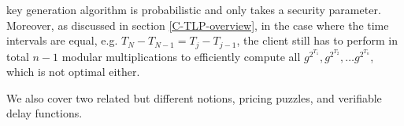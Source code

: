 key generation algorithm is probabilistic and  only takes a security parameter. Moreover, as discussed in section \ref{C-TLP-overview}, in the case where the time intervals are equal, e.g. $T_{\scriptscriptstyle N}-T_{\scriptscriptstyle N-1}=T_{\scriptscriptstyle j}-T_{\scriptscriptstyle j-1}$, the client still has to perform in total $n-1$ modular multiplications to efficiently compute all $g^{\scriptscriptstyle 2^{\scriptscriptstyle T_{\scriptscriptstyle 1}}} , g^{\scriptscriptstyle 2^{\scriptscriptstyle T_{\scriptscriptstyle 2}}},… g^{\scriptscriptstyle 2^{\scriptscriptstyle T_{\scriptscriptstyle n}}}$, which is not optimal either. 




We also cover two related but different notions, pricing puzzles, and verifiable delay functions. 

